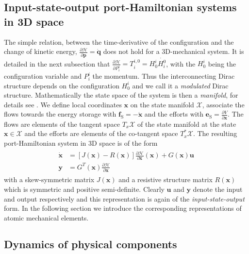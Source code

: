 \documentclass[a4paper,twoside, openright,12pt]{report}
\newcommand{\f}[1]{\boldsymbol{#1}}
\newcommand{\g}[1]{\text{#1}}
\begin{document}
\subsection{Input-state-output port-Hamiltonian systems in 3D space}
The simple relation, between the time-derivative of the configuration and the change of kinetic energy, $\frac{\partial \mathcal{H}}{\partial \f{p}}=\dot{\f{q}}$ does not hold for a 3D-mechanical system. It is detailed in the next subsection that $\frac{\partial \mathcal{H}}{\partial P_i^i} = T_i^{i,0} = H_0^i \dot{H_i^0}$, with the $H_0^i$ being the configuration variable and $P_i^i$ the momentum. Thus the interconnecting Dirac structure depends on the configuration $H_0^i$ and we call it a \emph{modulated} Dirac structure. Mathematically the state space of the system is then a \emph{manifold}, for details see \cite{Schaft_14}. We define local coordinates $\f{x}$ on the state manifold $\mathcal{X}$, associate the flows towards the energy storage with $\f{f}_\g{S} = -\dot{\f{x}}$ and the efforts with $\f{e}_\g{S} = \frac{\partial V}{\partial \f{x}}$. The flows are elements of the tangent space $T_x\mathcal{X}$ of the state manifold at the state $\f{x} \in \mathcal{X}$ and the efforts are elements of the co-tangent space $T_x^*\mathcal{X}$. The resulting port-Hamiltonian system in 3D space is of the form
\begin{eqnarray}
\begin{aligned}
\dot{\f{x}} &= [J(\f{x})-R(\f{x})]\frac{\partial \mathcal{H}}{\partial \f{x}}(\f{x}) + G(\f{x}) \f{u} \\
\f{y} &= G^T(\f{x})\frac{\partial \mathcal{H}}{\partial \f{x}}
\end{aligned}
\end{eqnarray}
with a skew-symmetric matrix $J(\f{x})$ and a resistive structure matrix $R(\f{x})$ which is symmetric and positive semi-definite. Clearly $\f{u}$ and $\f{y}$ denote the input and output respectively and this representation is again of the \emph{input-state-output} form. In the following section we introduce the corresponding representations of atomic mechanical elements.




\subsection{Dynamics of physical components}\label{SS:DynamicsPhysicalComponents}
\end{document}
